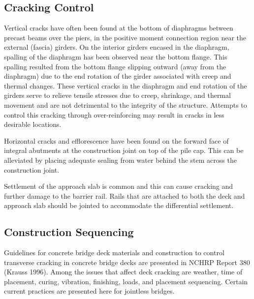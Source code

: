 \subsection{Cracking Control}
Vertical cracks have often been found at the bottom of diaphragms between precast beams over the piers, in the
positive moment connection region near the external (fascia) girders.
 On the interior girders encased in the
diaphragm, spalling of the diaphragm has been observed near the bottom flange. This spalling resulted from the
bottom flange slipping outward (away from the diaphragm) due to the end rotation of the girder associated with creep
and thermal changes. These vertical cracks in the diaphragm and end rotation of the girders serve to relieve tensile
stresses due to creep, shrinkage, and thermal movement and are not detrimental to the integrity of the structure.
Attempts to control this cracking through over-reinforcing may result in cracks in less desirable locations.

Horizontal cracks and efflorescence have been found on the forward face of integral abutments at the construction
joint on top of the pile cap. This can be alleviated by placing adequate sealing from water behind the stem across the
construction joint.

Settlement of the approach slab is common and this can cause cracking and further damage to the barrier rail.
Rails that are attached to both the deck and approach slab should be jointed to accommodate the differential
settlement.

\subsection{Construction Sequencing}
\label{subsec:construction-sequencing}
Guidelines for concrete bridge deck materials and construction to control transverse cracking in concrete bridge
decks are presented in NCHRP Report 380 (Krauss 1996). Among the issues that affect deck cracking are weather,
time of placement, curing, vibration, finishing, loads, and placement sequencing. Certain current practices are
presented here for jointless bridges.

